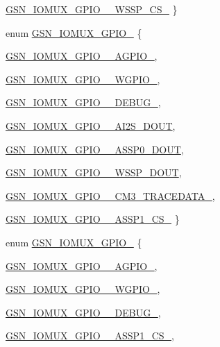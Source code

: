 \begin{DoxyCompactItemize}
\par
\hyperlink{a00519_a367109678df687289a7897b0cfd80b4aa3bddc00ddb04eaad0f562440fb819ff6}{GSN\_\-IOMUX\_\-GPIO\_\_\-WSSP\_\-CS\_}
 \}
\item 
enum \hyperlink{a00519_ae7e6faba6ec8760f7e46ff0fe8dc7412}{GSN\_\-IOMUX\_\-GPIO\_} \{ \par
\hyperlink{a00519_ae7e6faba6ec8760f7e46ff0fe8dc7412a9cb0cb392054c4791417459b674f345c}{GSN\_\-IOMUX\_\-GPIO\_\_\-AGPIO\_}, 
\par
\hyperlink{a00519_ae7e6faba6ec8760f7e46ff0fe8dc7412a87fb5cacc3cc0181550816930ff0b9d1}{GSN\_\-IOMUX\_\-GPIO\_\_\-WGPIO\_}, 
\par
\hyperlink{a00519_ae7e6faba6ec8760f7e46ff0fe8dc7412abfe021d8fdc45adc194e6cab1257f80a}{GSN\_\-IOMUX\_\-GPIO\_\_\-DEBUG\_}, 
\par
\hyperlink{a00519_ae7e6faba6ec8760f7e46ff0fe8dc7412a8e663393b0e69309bd473ce5cb5c6e19}{GSN\_\-IOMUX\_\-GPIO\_\_\-AI2S\_\-DOUT}, 
\par
\hyperlink{a00519_ae7e6faba6ec8760f7e46ff0fe8dc7412a6dacad750221dfa348696ee31a7dacc7}{GSN\_\-IOMUX\_\-GPIO\_\_\-ASSP0\_\-DOUT}, 
\par
\hyperlink{a00519_ae7e6faba6ec8760f7e46ff0fe8dc7412a94dc3423a0baa0d5c0331e9efd8b4719}{GSN\_\-IOMUX\_\-GPIO\_\_\-WSSP\_\-DOUT}, 
\par
\hyperlink{a00519_ae7e6faba6ec8760f7e46ff0fe8dc7412a08c1985d91d6fd02e5bcc7365fad956a}{GSN\_\-IOMUX\_\-GPIO\_\_\-CM3\_\-TRACEDATA\_}, 
\par
\hyperlink{a00519_ae7e6faba6ec8760f7e46ff0fe8dc7412af57fb69abfe2409597d2faacf1f37002}{GSN\_\-IOMUX\_\-GPIO\_\_\-ASSP1\_\-CS\_}
 \}
\item 
enum \hyperlink{a00519_a7fb4ec9b8fae8563ec4216544475854d}{GSN\_\-IOMUX\_\-GPIO\_} \{ \par
\hyperlink{a00519_a7fb4ec9b8fae8563ec4216544475854da2587e78cc6eb871d4e0a274f04ef3b2c}{GSN\_\-IOMUX\_\-GPIO\_\_\-AGPIO\_}, 
\par
\hyperlink{a00519_a7fb4ec9b8fae8563ec4216544475854da5949c1b12651f9de41b6cbc758701e43}{GSN\_\-IOMUX\_\-GPIO\_\_\-WGPIO\_}, 
\par
\hyperlink{a00519_a7fb4ec9b8fae8563ec4216544475854daba78b56a06a1942f632637c37800d98d}{GSN\_\-IOMUX\_\-GPIO\_\_\-DEBUG\_}, 
\par
\hyperlink{a00519_a7fb4ec9b8fae8563ec4216544475854da0bebfc68f2cd9355a7b8a600393b4b51}{GSN\_\-IOMUX\_\-GPIO\_\_\-ASSP1\_\-CS\_}, 
\par

\end{DoxyCompactItemize}
